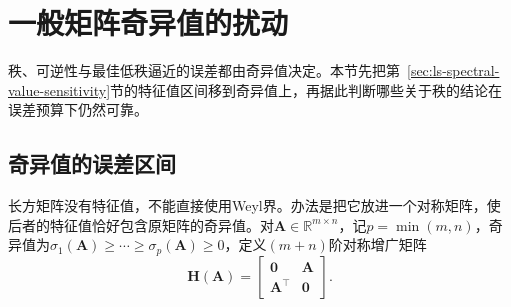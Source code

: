 
\section{一般矩阵奇异值的扰动}
\label{sec:ls-singular-value-sensitivity}

秩、可逆性与最佳低秩逼近的误差都由奇异值决定。本节先把第~\ref{sec:ls-spectral-value-sensitivity}节的特征值区间移到奇异值上，再据此判断哪些关于秩的结论在误差预算下仍然可靠。

\subsection{奇异值的误差区间}

长方矩阵没有特征值，不能直接使用Weyl界。办法是把它放进一个对称矩阵，使后者的特征值恰好包含原矩阵的奇异值。对$\bm A\in\mathbb R^{m\times n}$，记$p=\min(m,n)$，奇异值为$\sigma_1(\bm A)\geq\cdots\geq\sigma_p(\bm A)\geq0$，定义$(m+n)$阶对称增广矩阵
\[
 \bm H(\bm A)=\begin{bmatrix}\bm0&\bm A\\\bm A^\top&\bm0\end{bmatrix}.
\]

